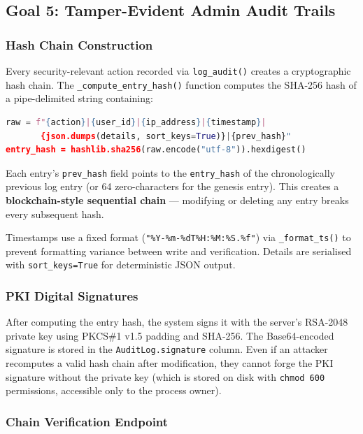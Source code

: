 \subsection{Goal 5: Tamper-Evident Admin Audit Trails}

\subsubsection{Hash Chain Construction}

Every security-relevant action recorded via \texttt{log\_audit()} creates a cryptographic hash chain. The \texttt{\_compute\_entry\_hash()} function computes the SHA-256 hash of a pipe-delimited string containing:

\begin{lstlisting}[language=Python]
raw = f"{action}|{user_id}|{ip_address}|{timestamp}|
       {json.dumps(details, sort_keys=True)}|{prev_hash}"
entry_hash = hashlib.sha256(raw.encode("utf-8")).hexdigest()
\end{lstlisting}

Each entry's \texttt{prev\_hash} field points to the \texttt{entry\_hash} of the chronologically previous log entry (or 64 zero-characters for the genesis entry). This creates a \textbf{blockchain-style sequential chain} — modifying or deleting any entry breaks every subsequent hash.

Timestamps use a fixed format (\texttt{"\%Y-\%m-\%dT\%H:\%M:\%S.\%f"}) via \texttt{\_format\_ts()} to prevent formatting variance between write and verification. Details are serialised with \texttt{sort\_keys=True} for deterministic JSON output.

\subsubsection{PKI Digital Signatures}

After computing the entry hash, the system signs it with the server's RSA-2048 private key using PKCS\#1 v1.5 padding and SHA-256. The Base64-encoded signature is stored in the \texttt{AuditLog.signature} column. Even if an attacker recomputes a valid hash chain after modification, they cannot forge the PKI signature without the private key (which is stored on disk with \texttt{chmod 600} permissions, accessible only to the process owner).

\subsubsection{Chain Verification Endpoint}

